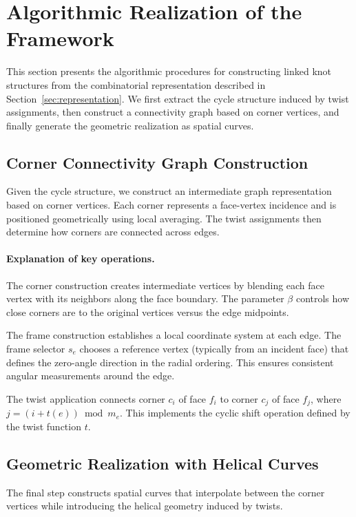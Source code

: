\documentclass[acmtog,anonymous,review]{acmart}
\begin{document}
\section{Algorithmic Realization of the Framework}
\label{sec:algorithmic_realization}

This section presents the algorithmic procedures for constructing linked knot structures from the combinatorial representation described in Section~\ref{sec:representation}. We first extract the cycle structure induced by twist assignments, then construct a connectivity graph based on corner vertices, and finally generate the geometric realization as spatial curves.

\subsection{Corner Connectivity Graph Construction}

Given the cycle structure, we construct an intermediate graph representation based on corner vertices. Each corner represents a face-vertex incidence and is positioned geometrically using local averaging. The twist assignments then determine how corners are connected across edges.

\paragraph{Explanation of key operations.}
The corner construction creates intermediate vertices by blending each face vertex with its neighbors along the face boundary. The parameter $\beta$ controls how close corners are to the original vertices versus the edge midpoints.

The frame construction establishes a local coordinate system at each edge. The frame selector $s_e$ chooses a reference vertex (typically from an incident face) that defines the zero-angle direction in the radial ordering. This ensures consistent angular measurements around the edge.

The twist application connects corner $c_i$ of face $f_i$ to corner $c_j$ of face $f_j$, where $j = (i + t(e)) \bmod m_e$. This implements the cyclic shift operation defined by the twist function $t$.

\subsection{Geometric Realization with Helical Curves}

The final step constructs spatial curves that interpolate between the corner vertices while introducing the helical geometry induced by twists.
\end{document}

